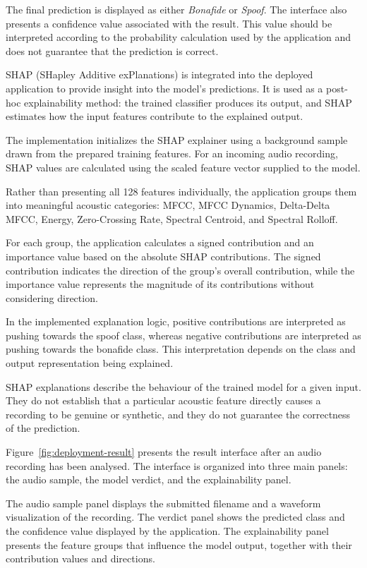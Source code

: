 \documentclass[12pt,a4paper]{report}
\begin{document}
The final prediction is displayed as either \textit{Bonafide}
or \textit{Spoof}. The interface also presents a confidence
value associated with the result. This value should be
interpreted according to the probability calculation used
by the application and does not guarantee that the prediction
is correct.

SHAP (SHapley Additive exPlanations) is integrated into the
deployed application to provide insight into the model's
predictions. It is used as a post-hoc explainability method:
the trained classifier produces its output, and SHAP estimates
how the input features contribute to the explained output.

The implementation initializes the SHAP explainer using a
background sample drawn from the prepared training features.
For an incoming audio recording, SHAP values are calculated
using the scaled feature vector supplied to the model.

Rather than presenting all 128 features individually, the
application groups them into meaningful acoustic categories:
MFCC, MFCC Dynamics, Delta-Delta MFCC, Energy,
Zero-Crossing Rate, Spectral Centroid, and Spectral Rolloff.

For each group, the application calculates a signed contribution
and an importance value based on the absolute SHAP contributions.
The signed contribution indicates the direction of the group's
overall contribution, while the importance value represents
the magnitude of its contributions without considering direction.

In the implemented explanation logic, positive contributions
are interpreted as pushing towards the spoof class, whereas
negative contributions are interpreted as pushing towards the
bonafide class. This interpretation depends on the class and
output representation being explained.

SHAP explanations describe the behaviour of the trained model
for a given input. They do not establish that a particular
acoustic feature directly causes a recording to be genuine
or synthetic, and they do not guarantee the correctness of
the prediction.

Figure~\ref{fig:deployment-result} presents the result interface
after an audio recording has been analysed. The interface is
organized into three main panels: the audio sample, the model
verdict, and the explainability panel.

The audio sample panel displays the submitted filename and
a waveform visualization of the recording. The verdict panel
shows the predicted class and the confidence value displayed
by the application. The explainability panel presents the
feature groups that influence the model output, together
with their contribution values and directions.
\end{document}
